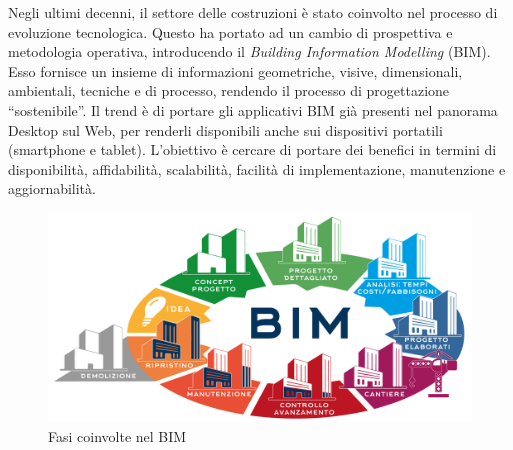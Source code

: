 Negli ultimi decenni, il settore delle costruzioni è stato coinvolto nel processo di evoluzione tecnologica.
Questo ha portato ad un cambio di prospettiva e metodologia operativa, introducendo il \emph{Building Information Modelling} (BIM).
Esso fornisce un insieme di informazioni geometriche, visive, dimensionali, ambientali, tecniche e di processo, rendendo
il processo di progettazione ``sostenibile''.
Il trend è di portare gli applicativi BIM già presenti nel panorama Desktop sul Web, per renderli disponibili anche
sui dispositivi portatili (smartphone e tablet). L'obiettivo è cercare di portare dei benefici in termini di disponibilità, affidabilità,
scalabilità, facilità di implementazione, manutenzione e aggiornabilità.

\begin{figure}[htbp] %
   \centering
   \includegraphics[width=1\linewidth]{images/bim}
   \caption{Fasi coinvolte nel BIM}
   \label{fig:bim}
\end{figure}
\newpage
